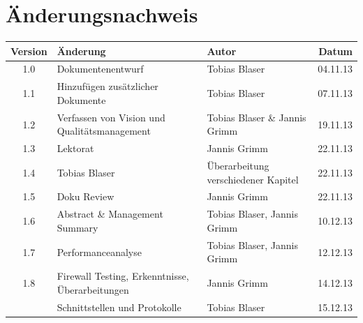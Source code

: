 




\chapter*{Änderungsnachweis}
\begin{tabularx}{\textwidth}{|cXlr|} %
		\hline
		\textbf{Version} & \textbf{Änderung} & \textbf{Autor} & \textbf{Datum}\\
		\hline
		1.0 & Dokumentenentwurf & Tobias Blaser & 04.11.13\\
		1.1 & Hinzufügen zusätzlicher Dokumente & Tobias Blaser & 07.11.13\\
		1.2 & Verfassen von Vision und Qualitätsmanagement & Tobias Blaser \& Jannis Grimm & 19.11.13\\
		1.3 & Lektorat & Jannis Grimm & 22.11.13\\
		1.4 & Tobias Blaser & Überarbeitung verschiedener Kapitel & 22.11.13\\
		1.5 & Doku Review & Jannis Grimm & 22.11.13\\
		1.6 & Abstract \& Management Summary & Tobias Blaser, Jannis Grimm & 10.12.13\\
		1.7 & Performanceanalyse & Tobias Blaser, Jannis Grimm & 12.12.13\\
		1.8 & Firewall Testing, Erkenntnisse, Überarbeitungen & Jannis
		Grimm & 14.12.13\\
		\versionnumber & Schnittstellen und Protokolle & Tobias Blaser & 15.12.13\\
		\hline
\end{tabularx}

\tableofcontents
















